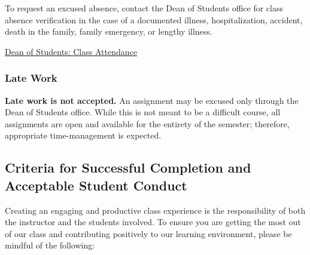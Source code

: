 \documentclass[11pt]{article}
\begin{document}
To request an excused absence, contact the Dean of Students office for class absence verification in the case of a documented illness, hospitalization, accident, death in the family, family emergency, or lengthy illness.

\href{https://studentlife.gatech.edu/dean-students/class-attendance}{Dean of Students: Class Attendance}

\subsubsection*{Late Work}

\textbf{Late work is not accepted.} An assignment may be excused only through the Dean of Students office. While this is not meant to be a difficult course, all assignments are open and available for the entirety of the semester; therefore, appropriate time-management is expected.

\subsection*{Criteria for Successful Completion and Acceptable Student Conduct}

Creating an engaging and productive class experience is the
responsibility of both the instructor and the students involved. To
ensure you are getting the most out of our class and contributing
positively to our learning environment, please be mindful of the
following:
\end{document}

